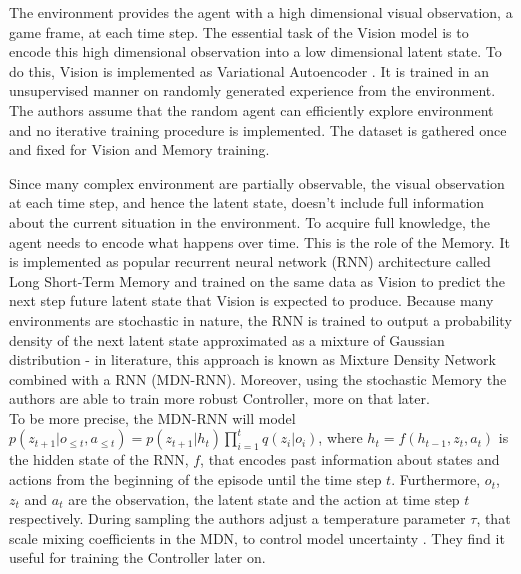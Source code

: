 The environment provides the agent with a high dimensional visual observation, a game frame, at each time step. The essential task of the Vision model is to encode this high dimensional observation into a low dimensional latent state. To do this, Vision is implemented as Variational Autoencoder \cite{Algo.VAE}. It is trained in an unsupervised manner on randomly generated experience from the environment. The authors assume that the random agent can efficiently explore environment and no iterative training procedure is implemented. The dataset is gathered once and fixed for Vision and Memory training.

Since many complex environment are partially observable, the visual observation at each time step, and hence the latent state, doesn't include full information about the current situation in the environment. To acquire full knowledge, the agent needs to encode what happens over time. This is the role of the Memory. It is implemented as popular recurrent neural network (RNN) architecture called Long Short-Term Memory \cite{Algo.LSTM} and trained on the same data as Vision to predict the next step future latent state that Vision is expected to produce. Because many environments are stochastic in nature, the RNN is trained to output a probability density of the next latent state approximated as a mixture of Gaussian distribution - in literature, this approach is known as Mixture Density Network combined with a RNN \cite{Algo.MDNRNN} (MDN-RNN). Moreover, using the stochastic Memory the authors are able to train more robust Controller, more on that later. \\
To be more precise, the MDN-RNN will model $p(z_{t+1} | o_{\leqslant t}, a_{\leqslant t}) = p(z_{t+1} | h_t) \prod_{i=1}^t q(z_i | o_i)$, where $h_t = f(h_{t-1}, z_t, a_t)$ is the hidden state of the RNN, $f$, that encodes past information about states and actions from the beginning of the episode until the time step $t$. Furthermore, $o_{t}$, $z_{t}$ and $a_{t}$ are the observation, the latent state and the action at time step $t$ respectively. During sampling the authors adjust a temperature parameter $\tau$, that scale mixing coefficients in the MDN, to control model uncertainty \cite{Algo.Sketch-RNN}. They find it useful for training the Controller later on.

